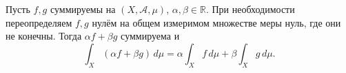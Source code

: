 \label{ticket:36}

\begin{theorem}
Пусть $f,g$ суммируемы на $(X,\mathcal A,\mu)$, $\alpha,\beta\in\mathbb R$.
При необходимости переопределяем $f,g$ нулём на общем измеримом множестве меры нуль, где они не конечны.
Тогда $\alpha f+\beta g$ суммируема и
\[
  \int_X(\alpha f+\beta g)\,d\mu
  =\alpha\int_X f\,d\mu+\beta\int_X g\,d\mu.
\]
\end{theorem}

